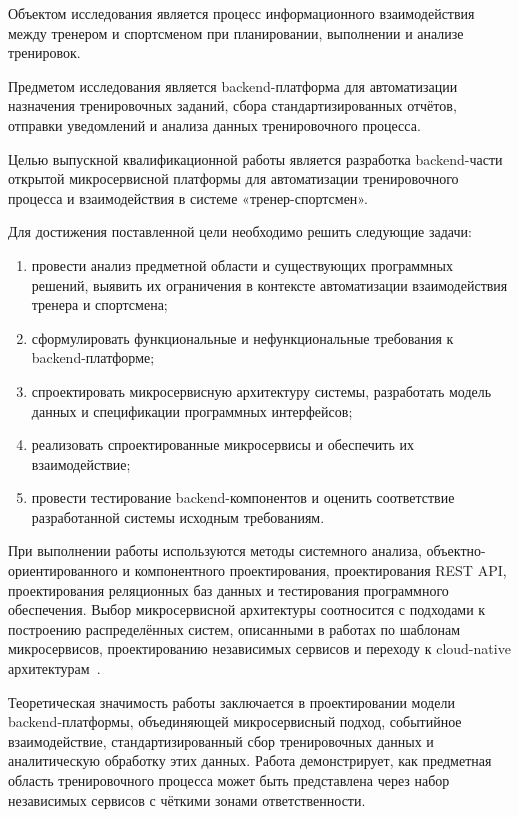 Объектом исследования является процесс информационного взаимодействия между тренером и спортсменом при планировании, выполнении и анализе тренировок.

Предметом исследования является backend-платформа для автоматизации назначения тренировочных заданий, сбора стандартизированных отчётов, отправки уведомлений и анализа данных тренировочного процесса.

Целью выпускной квалификационной работы является разработка backend-части открытой микросервисной платформы для автоматизации тренировочного процесса и взаимодействия в системе «тренер-спортсмен».

Для достижения поставленной цели необходимо решить следующие задачи:

\begin{enumerate}
\def\labelenumi{\arabic{enumi}.}
\tightlist
\item
  провести анализ предметной области и существующих программных решений, выявить их ограничения в контексте автоматизации взаимодействия тренера и спортсмена;
\item
  сформулировать функциональные и нефункциональные требования к backend-платформе;
\item
  спроектировать микросервисную архитектуру системы, разработать модель данных и спецификации программных интерфейсов;
\item
  реализовать спроектированные микросервисы и обеспечить их взаимодействие;
\item
  провести тестирование backend-компонентов и оценить соответствие разработанной системы исходным требованиям.
\end{enumerate}

При выполнении работы используются методы системного анализа, объектно-ориентированного и компонентного проектирования, проектирования REST API, проектирования реляционных баз данных и тестирования программного обеспечения. Выбор микросервисной архитектуры соотносится с подходами к построению распределённых систем, описанными в работах по шаблонам микросервисов, проектированию независимых сервисов и переходу к cloud-native архитектурам~\cite{richardson-microservices,newman-microservices-2021,dragoni-microservices,balalaie-microservices-devops}.

Теоретическая значимость работы заключается в проектировании модели backend-платформы, объединяющей микросервисный подход, событийное взаимодействие, стандартизированный сбор тренировочных данных и аналитическую обработку этих данных. Работа демонстрирует, как предметная область тренировочного процесса может быть представлена через набор независимых сервисов с чёткими зонами ответственности.

